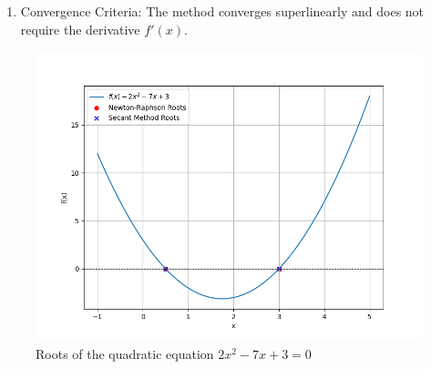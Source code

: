 \documentclass[journal]{IEEEtran}
\begin{document}
\begin{enumerate}
\begin{enumerate}
\item{Convergence Criteria:}
The method converges superlinearly and does not require the derivative $ f'(x) $.
\end{enumerate}
\begin{figure}[h!]
   \centering
   \includegraphics[width=0.7\linewidth]{figs/fig2.png}
   \caption{Roots of the quadratic equation $2x^2 - 7x + 3 = 0$}
\end{figure}
\end{enumerate}
\end{document}
